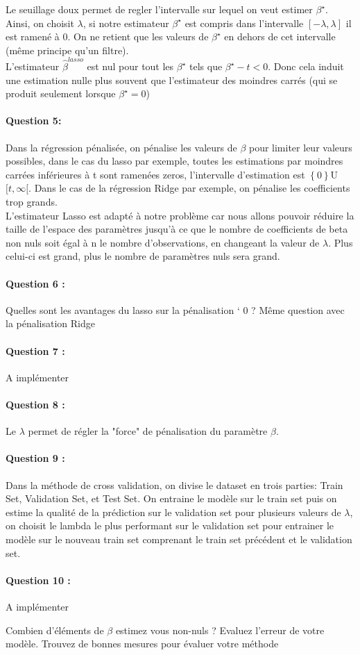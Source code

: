 \documentclass{article}
\begin{document}
Le seuillage doux permet de regler l'intervalle sur lequel on veut estimer $\beta^{\star}$. Ainsi, on choisit $\lambda$, si notre estimateur $\beta^{\star}$ est compris dans l'intervalle $[-\lambda,\lambda]$ il est ramené à 0. On ne retient que les valeurs de $\beta^{\star}$ en dehors de cet intervalle (même principe qu'un filtre).
\\L'estimateur $\hat{\beta}^{lasso}$ est nul pour tout les $\beta^{\star}$ tels que $\beta^{\star} - t < 0$. Donc cela induit une estimation nulle plus souvent que l'estimateur des moindres carrés (qui se produit seulement lorsque $\beta^{\star} = 0$)

\paragraph{Question 5:}
Dans la régression pénalisée, on pénalise les valeurs de $\beta$ pour limiter leur valeurs possibles, dans le cas du lasso par exemple, toutes les estimations par moindres carrées inférieures à t sont ramenées  zeros, l'intervalle d'estimation est $\left\lbrace0\right\rbrace$U${[t,\infty[}$. Dans le cas de la régression Ridge par exemple, on pénalise les coefficients trop grands.
\\ L'estimateur Lasso est adapté à notre problème car nous allons pouvoir réduire la taille de l'espace des paramètres jusqu'à ce que le nombre de coefficients de beta non nuls soit égal à n le nombre d'observations, en changeant la valeur de $\lambda$. Plus celui-ci est grand, plus le nombre de paramètres nuls sera grand.



\paragraph{Question 6 :}
Quelles sont les avantages du lasso sur la pénalisation ` 0 ?
Même question avec la pénalisation Ridge

\paragraph{Question 7 :}
A implémenter

\paragraph{Question 8 :}
Le $\lambda$ permet de régler la "force" de pénalisation du paramètre $\beta$.

\paragraph{Question 9 :}
Dans la méthode de cross validation, on divise le dataset en trois parties: 
Train Set, Validation Set, et Test Set.
On entraine le modèle sur le train set puis on estime la qualité de la prédiction sur le validation set pour plusieurs valeurs de $\lambda$, on choisit le lambda le plus performant sur le validation set pour entrainer le modèle sur le nouveau train set comprenant le train set précédent et le validation set.
\paragraph{Question 10 :}
A implémenter

Combien d’éléments de $\beta$ estimez vous non-nuls ? Evaluez l’erreur de votre modèle. Trouvez
de bonnes mesures pour évaluer votre méthode
\end{document}
